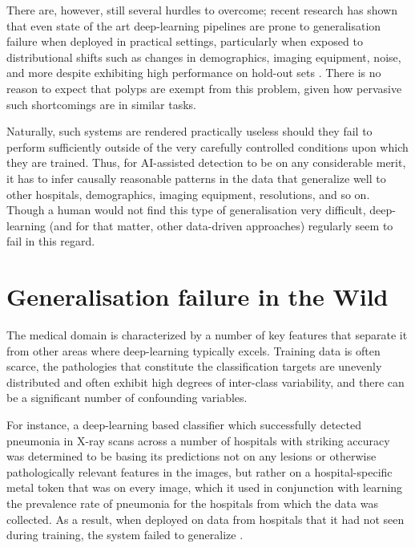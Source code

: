 	
	There are, however, still several hurdles to overcome; recent research has shown that even state of the art deep-learning pipelines are prone to generalisation failure when deployed in practical settings, particularly when exposed to distributional shifts such as changes in demographics, imaging equipment, noise, and more despite exhibiting high performance on hold-out sets \cite{retinopathy, damour2020underspecification, pneumonia, shortcut_learning}. There is no reason to expect that polyps are exempt from this problem, given how pervasive such shortcomings are in similar tasks.
	
	Naturally, such systems are rendered practically useless should they fail to perform sufficiently outside of the very carefully controlled conditions upon which they are trained. Thus, for AI-assisted detection to be on any considerable merit, it has to infer causally reasonable patterns in the data that generalize well to other hospitals, demographics, imaging equipment, resolutions, and so on. Though a human would not find this type of generalisation very difficult, deep-learning (and for that matter, other data-driven approaches) regularly seem to fail in this regard. 

\section{Generalisation failure in the Wild} \label{case_studies}

	The medical domain is characterized by a number of key features that separate it from other areas where deep-learning typically excels. Training data is often scarce, the pathologies that constitute the classification targets are unevenly distributed and often exhibit high degrees of inter-class variability, and there can be a significant number of confounding variables. 
		
	For instance, a deep-learning based classifier which successfully detected pneumonia in X-ray scans across a number of hospitals with striking accuracy was determined to be basing its predictions not on any lesions or otherwise pathologically relevant features in the images, but rather on a hospital-specific metal token that was on every image, which it used in conjunction with learning the prevalence rate of pneumonia for the hospitals from which the data was collected. As a result, when deployed on data from hospitals that it had not seen during training, the system failed to generalize \cite{pneumonia}. 
		
